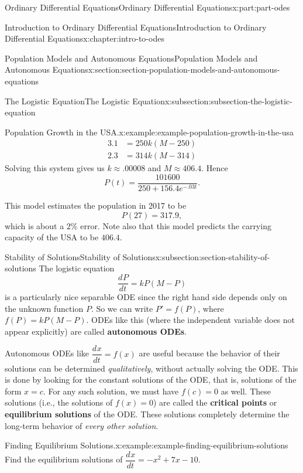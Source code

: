 \documentclass[oneside,10pt,]{book}
\newcommand{\terminology}[1]{\textbf{#1}}
\numberwithin{equation}{part}
\newcommand{\dv}[3][]{\dfrac{d^{#1} #2}{d #3^{#1}}}
\begin{document}
\begin{partptx}{Ordinary Differential Equations}{}{Ordinary Differential Equations}{}{}{x:part:part-odes}
\begin{chapterptx}{Introduction to Ordinary Differential Equations}{}{Introduction to Ordinary Differential Equations}{}{}{x:chapter:intro-to-odes}
\begin{sectionptx}{Population Models and Autonomous Equations}{}{Population Models and Autonomous Equations}{}{}{x:section:section-population-models-and-autonomous-equations}
\begin{subsectionptx}{The Logistic Equation}{}{The Logistic Equation}{}{}{x:subsection:subsection-the-logistic-equation}
\begin{example}{Population Growth in the USA.}{x:example:example-population-growth-in-the-usa}
\begin{align*}
3.1 & = 250k(M - 250) \\
2.3 & = 314k(M - 314) 
\end{align*}
Solving this system gives us \(k\approx.00008\) and \(M \approx 406.4\). Hence%
\begin{equation*}
P(t) = \frac{101600}{250 + 156.4e^{-.03t}}.
\end{equation*}
%
\par
This model estimates the population in 2017 to be%
\begin{equation*}
P(27) = 317.9,
\end{equation*}
which is about a \(2\%\) error. Note also that this model predicts the carrying capacity of the USA to be \(406.4\).%
\end{example}
\end{subsectionptx}
%
%
\typeout{************************************************}
\typeout{************************************************}
%
\begin{subsectionptx}{Stability of Solutions}{}{Stability of Solutions}{}{}{x:subsection:section-stability-of-solutions}
The logistic equation%
\begin{equation*}
\dv{P}{t} = kP(M-P)
\end{equation*}
is a particularly nice separable ODE since the right hand side depends only on the unknown function \(P\). So we can write \(P' = f(P)\), where \(f(P) = kP(M-P)\). ODEs like this (where the independent variable does not appear explicitly) are called \terminology{autonomous ODEs}.%
\par
Autonomous ODEs like \(\dv{x}{t} = f(x)\) are useful because the behavior of their solutions can be determined \emph{qualitatively}, without actually solving the ODE. This is done by looking for the constant solutions of the ODE, that is, solutions of the form \(x = c\). For any such solution, we must have \(f(c) = 0\) as well. These solutions (i.e., the solutions of \(f(x) = 0\)) are called the \terminology{critical points} or \terminology{equilibrium solutions} of the ODE. These solutions completely determine the long-term behavior of \emph{every other solution}.%
\begin{example}{Finding Equilibrium Solutions.}{x:example:example-finding-equilibrium-solutions}%
Find the equilibrium solutions of \(\dv{x}{t} = -x^{2} + 7x - 10\).%
\par\smallskip%

\end{example}
\end{subsectionptx}
\end{sectionptx}
\end{chapterptx}
\end{partptx}
\end{document}
